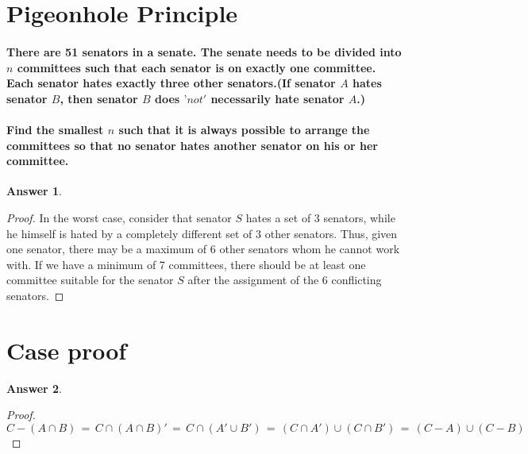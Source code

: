 \documentclass{article}
\renewcommand{\(}{\left(}
\renewcommand{\)}{\right)}
\theoremstyle{plain}
\theoremstyle{plain}
\theoremstyle{definition}
\newtheorem*{answer}{Answer}
\begin{document}
\section{Pigeonhole Principle }
\paragraph*{
There are 51 senators in a senate. The senate needs to be divided into $n$ committees such that each senator is on exactly one committee. Each senator hates exactly three other senators.(If senator $A$ hates senator $B$, then senator $B$ does $’not'$ necessarily hate senator $A$.)
}
\paragraph*{
Find the smallest $n$ such that it is always possible to arrange the committees so that no senator hates another senator on his or her committee.
}
\begin{shaded}
\begin{answer}
\begin{proof}
In the worst case, consider that senator $S$ hates a set of 3 senators, while he himself is hated by a completely different set of 3 other senators. Thus, given one senator, there may be a maximum of 6 other senators whom he cannot work with. If we have a minimum of 7 committees, there should be at least one committee suitable for the senator $S$ after the assignment of the 6 conflicting senators.
\end{proof}
\end{answer}
\end{shaded}

\section{Case proof}

\begin{shaded}
\begin{answer}
\begin{proof}
  $$ C - (A\cap B)  \, = \, C \cap (A \cap B)' \, = \, C \cap ( A' \cup B' ) \,
  = \, (C \cap A' ) \cup (C \cap B' ) \, = \, ( C - A ) \cup ( C - B )  $$
\end{proof}
\end{answer}
\end{shaded}
\end{document}
